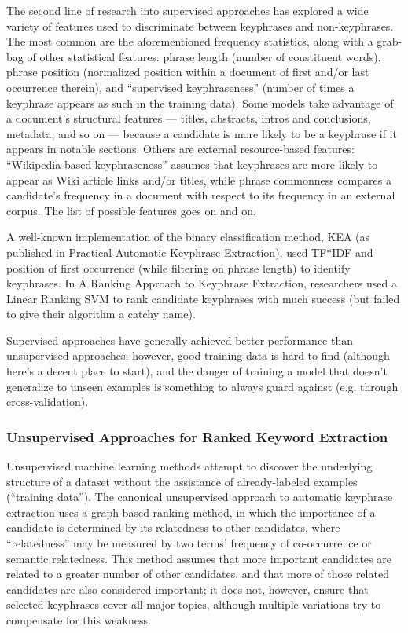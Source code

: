 \documentclass[conference]{IEEEtran}
\begin{document}
The second line of research into supervised approaches has explored a wide variety of features used to discriminate between keyphrases and non-keyphrases. The most common are the aforementioned frequency statistics, along with a grab-bag of other statistical features: phrase length (number of constituent words), phrase position (normalized position within a document of first and/or last occurrence therein), and “supervised keyphraseness” (number of times a keyphrase appears as such in the training data). Some models take advantage of a document’s structural features — titles, abstracts, intros and conclusions, metadata, and so on — because a candidate is more likely to be a keyphrase if it appears in notable sections. Others are external resource-based features: “Wikipedia-based keyphraseness” assumes that keyphrases are more likely to appear as Wiki article links and/or titles, while phrase commonness compares a candidate’s frequency in a document with respect to its frequency in an external corpus. The list of possible features goes on and on.

A well-known implementation of the binary classification method, KEA (as published in Practical Automatic Keyphrase Extraction), used TF*IDF and position of first occurrence (while filtering on phrase length) to identify keyphrases. In A Ranking Approach to Keyphrase Extraction, researchers used a Linear Ranking SVM to rank candidate keyphrases with much success (but failed to give their algorithm a catchy name).

Supervised approaches have generally achieved better performance than unsupervised approaches; however, good training data is hard to find (although here’s a decent place to start), and the danger of training a model that doesn’t generalize to unseen examples is something to always guard against (e.g. through cross-validation).

\subsubsection{Unsupervised Approaches for Ranked Keyword Extraction\label{unsupervised-review}}
Unsupervised machine learning methods attempt to discover the underlying structure of a dataset without the assistance of already-labeled examples (“training data”). The canonical unsupervised approach to automatic keyphrase extraction uses a graph-based ranking method, in which the importance of a candidate is determined by its relatedness to other candidates, where “relatedness” may be measured by two terms’ frequency of co-occurrence or semantic relatedness. This method assumes that more important candidates are related to a greater number of other candidates, and that more of those related candidates are also considered important; it does not, however, ensure that selected keyphrases cover all major topics, although multiple variations try to compensate for this weakness.
\end{document}
